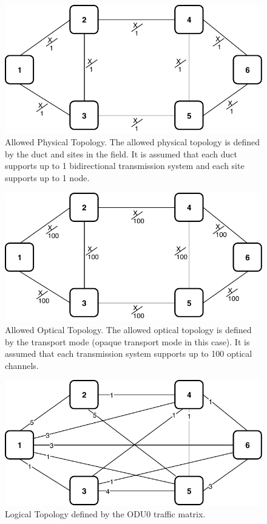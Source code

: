 \newpage
\vspace{20pt}
\begin{figure}[h!]
\centering
\includegraphics[width=13cm]{sdf/ilp/opaque_survivability/figures/allowed_physical_topology}
\caption{Allowed Physical Topology. The allowed physical topology is defined by the duct and sites in the field. It is assumed that each duct supports up to 1 bidirectional transmission system and each site supports up to 1 node.}
\label{allowed_physical_low}
\end{figure}

\vspace{20pt}
\begin{figure}[h!]
\centering
\includegraphics[width=13cm]{sdf/ilp/opaque_survivability/figures/allowed_optical_topology}
\caption{Allowed Optical Topology. The allowed optical topology is defined by the transport mode (opaque transport mode in this case). It is assumed that each transmission system supports up to 100 optical channels.}
\label{allowed_optical_low}
\end{figure}

\newpage
\begin{figure}[h!]
\centering
\includegraphics[width=12cm]{sdf/ilp/opaque_survivability/figures/logical_topology_ODU0_low}
\caption{Logical Topology defined by the ODU0 traffic matrix.}
\label{logical_ODU0_low}
\end{figure}

